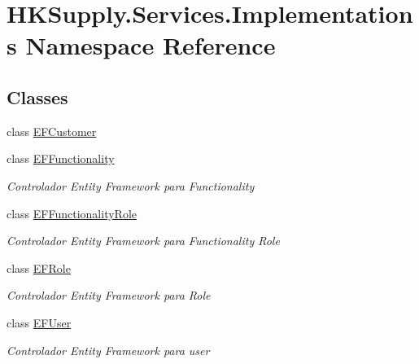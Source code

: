 \hypertarget{namespace_h_k_supply_1_1_services_1_1_implementations}{}\section{H\+K\+Supply.\+Services.\+Implementations Namespace Reference}
\label{namespace_h_k_supply_1_1_services_1_1_implementations}
\subsection*{Classes}
\begin{DoxyCompactItemize}
\item 
class \hyperlink{class_h_k_supply_1_1_services_1_1_implementations_1_1_e_f_customer}{E\+F\+Customer}
\item 
class \hyperlink{class_h_k_supply_1_1_services_1_1_implementations_1_1_e_f_functionality}{E\+F\+Functionality}
\begin{DoxyCompactList}\small\item\em Controlador Entity Framework para Functionality \end{DoxyCompactList}\item 
class \hyperlink{class_h_k_supply_1_1_services_1_1_implementations_1_1_e_f_functionality_role}{E\+F\+Functionality\+Role}
\begin{DoxyCompactList}\small\item\em Controlador Entity Framework para Functionality Role \end{DoxyCompactList}\item 
class \hyperlink{class_h_k_supply_1_1_services_1_1_implementations_1_1_e_f_role}{E\+F\+Role}
\begin{DoxyCompactList}\small\item\em Controlador Entity Framework para Role \end{DoxyCompactList}\item 
class \hyperlink{class_h_k_supply_1_1_services_1_1_implementations_1_1_e_f_user}{E\+F\+User}
\begin{DoxyCompactList}\small\item\em Controlador Entity Framework para user \end{DoxyCompactList}\end{DoxyCompactItemize}
